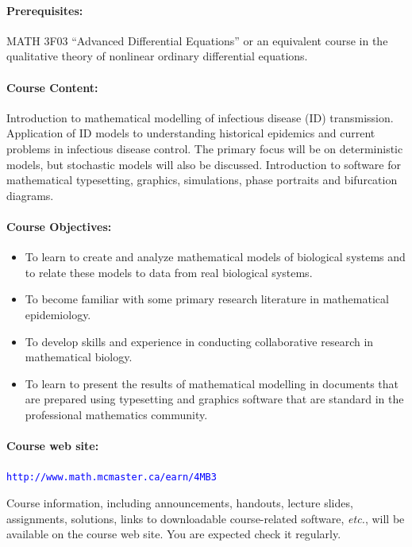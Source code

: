 \documentclass[12pt]{article}
\newcommand{\url}[1]{{\tt\textcolor{blue}{#1}}}
\begin{document}
\paragraph*{Prerequisites:} MATH 3F03 ``Advanced Differential Equations'' or an equivalent course in the qualitative theory of nonlinear ordinary differential equations.

\paragraph*{Course Content:}
Introduction to mathematical modelling of infectious disease (ID) transmission.  Application of ID models to understanding historical epidemics and current problems in infectious disease control.  The primary focus will be on deterministic models, but stochastic models will also be discussed.   Introduction to software for mathematical typesetting, graphics, simulations, phase portraits and bifurcation diagrams.

\paragraph*{Course Objectives:}

\begin{itemize}
\item To learn to create and analyze mathematical models of biological systems and to relate these models to data from real biological systems.  
\item To become familiar with some primary research literature in mathematical epidemiology.
\item To develop skills and experience in conducting collaborative research in mathematical biology.
\item To learn to present the results of mathematical modelling in documents that are prepared using typesetting and graphics software that are standard in the professional mathematics community.
\end{itemize}

\paragraph*{Course web site:} \url{http://www.math.mcmaster.ca/earn/4MB3}

\noindent
Course information, including announcements, handouts, lecture slides, assignments, solutions, links to downloadable course-related software, {\it etc.\/}, will be available on the course web site.  You are expected check it regularly.
\end{document}
